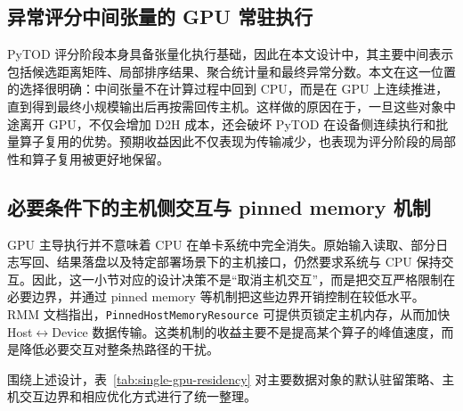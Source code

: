 \subsection{异常评分中间张量的 GPU 常驻执行}

PyTOD 评分阶段本身具备张量化执行基础，因此在本文设计中，其主要中间表示包括候选距离矩阵、局部排序结果、聚合统计量和最终异常分数。本文在这一位置的选择很明确：中间张量不在计算过程中回到 CPU，而是在 GPU 上连续推进，直到得到最终小规模输出后再按需回传主机。这样做的原因在于，一旦这些对象中途离开 GPU，不仅会增加 D2H 成本，还会破坏 PyTOD 在设备侧连续执行和批量算子复用的优势。预期收益因此不仅表现为传输减少，也表现为评分阶段的局部性和算子复用被更好地保留。

\subsection{必要条件下的主机侧交互与 pinned memory 机制}

GPU 主导执行并不意味着 CPU 在单卡系统中完全消失。原始输入读取、部分日志写回、结果落盘以及特定部署场景下的主机接口，仍然要求系统与 CPU 保持交互。因此，这一小节对应的设计决策不是“取消主机交互”，而是把交互严格限制在必要边界，并通过 pinned memory 等机制把这些边界开销控制在较低水平。RMM 文档指出，\texttt{PinnedHostMemoryResource} 可提供页锁定主机内存，从而加快 Host$\leftrightarrow$Device 数据传输\citep{rapids_rmm_pinned}。这类机制的收益主要不是提高某个算子的峰值速度，而是降低必要交互对整条热路径的干扰。

围绕上述设计，表~\ref{tab:single-gpu-residency} 对主要数据对象的默认驻留策略、主机交互边界和相应优化方式进行了统一整理。

